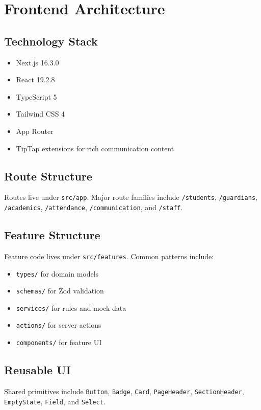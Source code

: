 \chapter{Frontend Architecture}
\section{Technology Stack}
\begin{itemize}
\item Next.js 16.3.0
\item React 19.2.8
\item TypeScript 5
\item Tailwind CSS 4
\item App Router
\item TipTap extensions for rich communication content
\end{itemize}

\section{Route Structure}
Routes live under \texttt{src/app}. Major route families include \texttt{/students}, \texttt{/guardians}, \texttt{/academics}, \texttt{/attendance}, \texttt{/communication}, and \texttt{/staff}.

\section{Feature Structure}
Feature code lives under \texttt{src/features}. Common patterns include:
\begin{itemize}
\item \texttt{types/} for domain models
\item \texttt{schemas/} for Zod validation
\item \texttt{services/} for rules and mock data
\item \texttt{actions/} for server actions
\item \texttt{components/} for feature UI
\end{itemize}



\section{Reusable UI}
Shared primitives include \texttt{Button}, \texttt{Badge}, \texttt{Card}, \texttt{PageHeader}, \texttt{SectionHeader}, \texttt{EmptyState}, \texttt{Field}, and \texttt{Select}.


